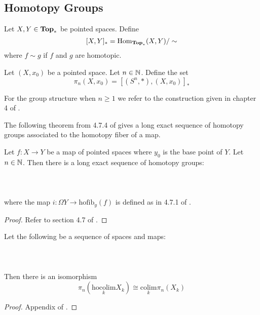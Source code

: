 \subsection{Homotopy Groups}
\begin{defn} Let $X,Y\in\bold{Top}_\ast$ be pointed spaces. Define $$[X,Y]_\ast=\operatorname{Hom}_{\bold{Top}_\ast}(X,Y)/\sim$$ where $f\sim g$ if $f$ and $g$ are homotopic. 
\end{defn}

\begin{defn} Let $(X,x_0)$ be a pointed space. Let $n\in\mathbb{N}$. Define the set $$\pi_n(X,x_0)=[(S^n,\ast),(X,x_0)]_\ast$$ 
\end{defn}

For the group structure when $n\geq 1$ we refer to the construction given in chapter 4 of \cite{AT}. 

The following theorem from 4.7.4 of \cite{ATTD} gives a long exact sequence of homotopy groups associated to the homotopy fiber of a map. 

\begin{thm}\label{thm:FiberSeq} Let $f:X\to Y$ be a map of pointed spaces where $y_0$ is the base point of $Y$. Let $n\in\mathbb{N}$. Then there is a long exact sequence of homotopy groups: \\~\\
\\~\\
where the map $i:\Omega Y\to\text{hofib}_y(f)$ is defined as in 4.7.1 of \cite{ATTD}. 
\begin{proof}
Refer to section 4.7 of \cite{ATTD}. 
\end{proof}
\end{thm}

\begin{prp}\label{prp:HomGrpPHocolim} Let the following be a sequence of spaces and maps: \\~\\
\\~\\
Then there is an isomorphism $$\pi_n(\underset{k}{\text{hocolim}}X_k)\cong\underset{k}{\text{colim}}\pi_n(X_k)$$
\begin{proof}
Appendix of \cite{FSHT}. 
\end{proof}
\end{prp}

